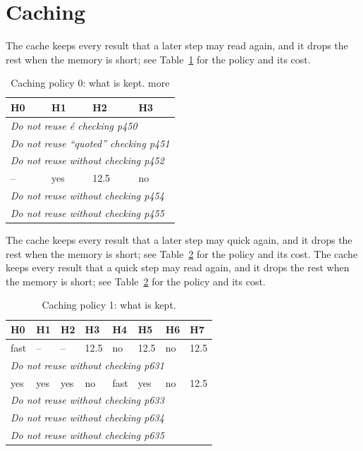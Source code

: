 \section{Caching}
The cache keeps every result that a later step may read again, and it drops the rest when the memory is short; see Table~\ref{tab:c0} for the policy and its cost. 

\begin{table}[t]
  \centering
  \caption{Caching policy 0: what is kept. more}\label{tab:c0}
  \begin{tabular}{llll}
    \toprule
    \textbf{H0} & \textbf{H1} & \textbf{H2} & \textbf{H3} \\
    \midrule
    \multicolumn{4}{l}{\emph{Do not reuse é checking p450}} \\
    \multicolumn{4}{l}{\emph{Do not reuse “quoted” checking p451}} \\
    \multicolumn{4}{l}{\emph{Do not reuse without checking p452}} \\
    -- & yes & 12.5 & no \\
    \multicolumn{4}{l}{\emph{Do not reuse without checking p454}} \\
    \multicolumn{4}{l}{\emph{Do not reuse without checking p455}} \\
    \bottomrule
  \end{tabular}
\end{table}

The cache keeps every result that a later step may quick again, and it drops the rest when the memory is short; see Table~\ref{tab:c1} for the policy and its cost. The cache keeps every result that a quick step may read again, and it drops the rest when the memory is short; see Table~\ref{tab:c1} for the policy and its cost. 

\begin{table}[t]
  \centering
  \caption{Caching policy 1: what is kept.}\label{tab:c1}
  \begin{tabular}{llllllll}
    \toprule
    \textbf{H0} & \textbf{H1} & \textbf{H2} & \textbf{H3} & \textbf{H4} & \textbf{H5} & \textbf{H6} & \textbf{H7} \\
    \midrule
    fast & -- & -- & 12.5 & no & 12.5 & no & 12.5 \\
    \multicolumn{8}{l}{\emph{Do not reuse without checking p631}} \\
    yes & yes & yes & no & fast & yes & no & 12.5 \\
    \multicolumn{8}{l}{\emph{Do not reuse without checking p633}} \\
    \multicolumn{8}{l}{\emph{Do not reuse without checking p634}} \\
    \multicolumn{8}{l}{\emph{Do not reuse without checking p635}} \\
    \bottomrule
  \end{tabular}
\end{table}

